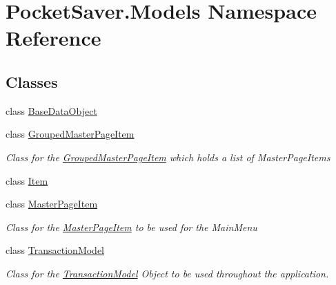 \hypertarget{namespace_pocket_saver_1_1_models}{}\section{Pocket\+Saver.\+Models Namespace Reference}
\label{namespace_pocket_saver_1_1_models}
\subsection*{Classes}
\begin{DoxyCompactItemize}
\item 
class \hyperlink{class_pocket_saver_1_1_models_1_1_base_data_object}{Base\+Data\+Object}
\item 
class \hyperlink{class_pocket_saver_1_1_models_1_1_grouped_master_page_item}{Grouped\+Master\+Page\+Item}
\begin{DoxyCompactList}\small\item\em Class for the \hyperlink{class_pocket_saver_1_1_models_1_1_grouped_master_page_item}{Grouped\+Master\+Page\+Item} which holds a list of Master\+Page\+Items \end{DoxyCompactList}\item 
class \hyperlink{class_pocket_saver_1_1_models_1_1_item}{Item}
\item 
class \hyperlink{class_pocket_saver_1_1_models_1_1_master_page_item}{Master\+Page\+Item}
\begin{DoxyCompactList}\small\item\em Class for the \hyperlink{class_pocket_saver_1_1_models_1_1_master_page_item}{Master\+Page\+Item} to be used for the Main\+Menu \end{DoxyCompactList}\item 
class \hyperlink{class_pocket_saver_1_1_models_1_1_transaction_model}{Transaction\+Model}
\begin{DoxyCompactList}\small\item\em Class for the \hyperlink{class_pocket_saver_1_1_models_1_1_transaction_model}{Transaction\+Model} Object to be used throughout the application. \end{DoxyCompactList}\end{DoxyCompactItemize}
